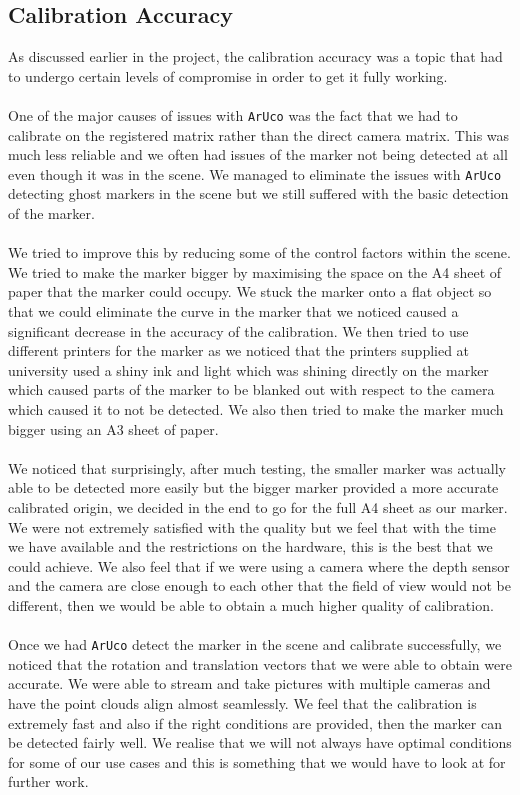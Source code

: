 \documentclass{article}
\begin{document}
\subsection{Calibration Accuracy}
As discussed earlier in the project, the calibration accuracy was a topic that had to undergo certain levels of compromise in order to get it fully working.
\\\\
One of the major causes of issues with \texttt{ArUco} \cite{aruco} was the fact that we had to calibrate on the registered matrix rather than the direct camera matrix. This was much less reliable and we often had issues of the marker not being detected at all even though it was in the scene. We managed to eliminate the issues with \texttt{ArUco} \cite{aruco} detecting ghost markers in the scene but we still suffered with the basic detection of the marker.
\\\\
We tried to improve this by reducing some of the control factors within the scene. We tried to make the marker bigger by maximising the space on the A4 sheet of paper that the marker could occupy. We stuck the marker onto a flat object so that we could eliminate the curve in the marker that we noticed caused a significant decrease in the accuracy of the calibration. We then tried to use different printers for the marker as we noticed that the printers supplied at university used a shiny ink and light which was shining directly on the marker which caused parts of the marker to be blanked out with respect to the camera which caused it to not be detected. We also then tried to make the marker much bigger using an A3 sheet of paper.
\\\\
We noticed that surprisingly, after much testing, the smaller marker was actually able to be detected more easily but the bigger marker provided a more accurate calibrated origin, we decided in the end to go for the full A4 sheet as our marker. We were not extremely satisfied with the quality but we feel that with the time we have available and the restrictions on the hardware, this is the best that we could achieve. We also feel that if we were using a camera where the depth sensor and the camera are close enough to each other that the field of view would not be different, then we would be able to obtain a much higher quality of calibration.
\\\\
Once we had \texttt{ArUco} \cite{aruco} detect the marker in the scene and calibrate successfully, we noticed that the rotation and translation vectors that we were able to obtain were accurate. We were able to stream and take pictures with multiple cameras and have the point clouds align almost seamlessly. We feel that the calibration is extremely fast and also if the right conditions are provided, then the marker can be detected fairly well. We realise that we will not always have optimal conditions for some of our use cases and this is something that we would have to look at for further work.
\end{document}
